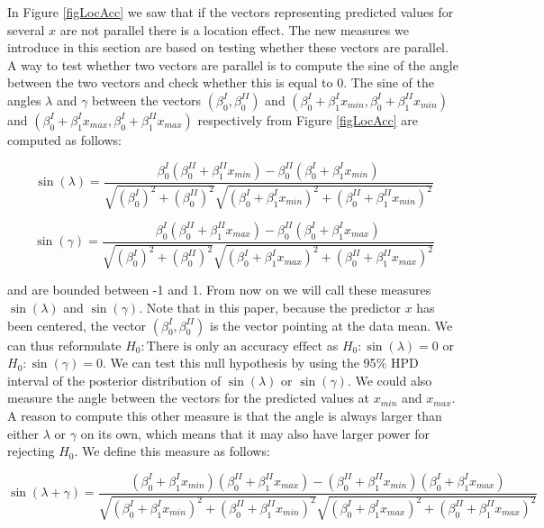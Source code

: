 \documentclass[]{interact}
\begin{document}
In Figure \ref{figLocAcc} we saw that if the vectors representing predicted
values for several $x$ are not parallel there is a location effect. The new
measures we introduce in this section are based on testing whether these vectors
are parallel. A way to test whether two vectors are parallel is to compute the
sine of the angle between the two vectors and check whether this is equal to 0.
The sine of the angles $\lambda$ and $\gamma$ between the vectors $(\beta^I_0,
\beta^{II}_0)$ and $(\beta^I_0 + \beta^I_1x_{min}, \beta^I_0 +
\beta^{II}_1x_{min})$ and $(\beta^I_0 + \beta^I_1x_{max}, \beta^I_0 +
\beta^{II}_1x_{max})$ respectively from Figure \ref{figLocAcc} are computed as
follows:

\begin{equation}
\sin(\lambda) = \frac{\beta^I_0(\beta^{II}_0 + \beta^{II}_1x_{min}) - \beta^{II}_0(\beta^I_0 + \beta^{I}_1x_{min})}{\sqrt{(\beta^I_0)^2 + (\beta^{II}_0)^2}\sqrt{(\beta^{I}_0 + \beta^{I}_1x_{min})^2 + (\beta^{II}_0 + \beta^{II}_1x_{min})^2}}
\end{equation}

\begin{equation}
\sin(\gamma) = \frac{\beta^I_0(\beta^{II}_0 + \beta^{II}_1x_{max}) - \beta^{II}_0(\beta^I_0 + \beta^{I}_1x_{max})}{\sqrt{(\beta^I_0)^2 + (\beta^{II}_0)^2}\sqrt{(\beta^{I}_0 + \beta^{I}_1x_{max})^2 + (\beta^{II}_0 + \beta^{II}_1x_{max})^2}}
\end{equation}

\noindent and are bounded between -1 and 1. From now on we will call these measures
$\sin(\lambda)$ and $\sin(\gamma)$. Note that in this paper, because the
predictor $x$ has been centered, the vector $(\beta^I_0, \beta^{II}_0)$ is the
vector pointing at the data mean. We can thus reformulate \textit{$H_0:
\text{There is only an accuracy effect}$} as \textit{$H_0: \sin(\lambda) = 0$}
or \textit{$H_0: \sin(\gamma) = 0$}. We can test this null hypothesis by using
the 95$\%$ HPD interval of the posterior distribution of $\sin(\lambda)$ or
$\sin(\gamma)$. We could also measure the angle between the vectors for the
predicted values at $x_{min}$ and $x_{max}$. A reason to compute this other
measure is that the angle is always larger than either $\lambda$ or $\gamma$
on its own, which means that it may also have larger power for rejecting
\textit{$H_0$}. We define this measure as follows:

\begin{equation}
\sin(\lambda + \gamma) = \frac{(\beta^I_0 + \beta^{I}_1x_{min})(\beta^{II}_0 + \beta^{II}_1x_{max}) - (\beta^{II}_0 + \beta^{II}_1x_{min})(\beta^I_0 + \beta^{I}_1x_{max})}{\sqrt{(\beta^I_0 + \beta^{I}_1x_{min})^2 + (\beta^{II}_0 + \beta^{II}_1x_{min})^2}\sqrt{(\beta^{I}_0 + \beta^{I}_1x_{max})^2 + (\beta^{II}_0 + \beta^{II}_1x_{max})^2}}
\end{equation}
\end{document}
